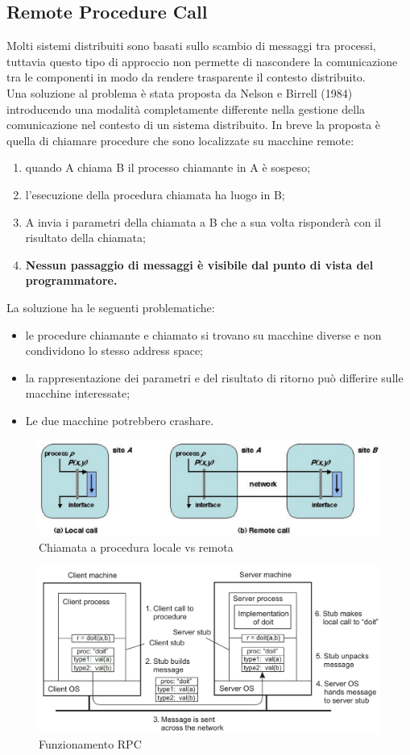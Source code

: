\documentclass[12pt]{article}
\begin{document}
	\subsection{Remote Procedure Call}
		Molti sistemi distribuiti sono basati sullo scambio di messaggi tra processi, tuttavia questo tipo di approccio non permette di nascondere la comunicazione tra le componenti in modo da rendere trasparente il contesto distribuito. \\
		Una soluzione al problema è stata proposta da Nelson e Birrell (1984) introducendo una modalità completamente differente nella gestione della comunicazione nel contesto di un sistema distribuito.
		In breve la proposta è quella di chiamare procedure che sono localizzate su macchine remote:
		\begin{enumerate}
			\item quando A chiama B il processo chiamante in A è sospeso;
			\item l'esecuzione della procedura chiamata ha luogo in B;
			\item A invia i parametri della chiamata a B che a sua volta risponderà con il risultato della chiamata;
			\item \textbf{Nessun passaggio di messaggi è visibile dal punto di vista del programmatore.}
		\end{enumerate}
		La soluzione ha le seguenti problematiche:
		\begin{itemize}
			\item le procedure chiamante e chiamato si trovano su macchine diverse e non condividono lo stesso address space;
			\item la rappresentazione dei parametri e del risultato di ritorno può differire sulle macchine interessate;
			\item Le due macchine potrebbero crashare.
		\end{itemize}
		\begin{figure}[h!]
			\centering
			\includegraphics[scale=0.50]{img/proc.png}
			\caption{Chiamata a procedura locale vs remota}
		\end{figure}
		\begin{figure}[h!]
			\centering
			\includegraphics[scale=0.50]{img/how.png}
			\caption{Funzionamento RPC}
		\end{figure}
\end{document}
